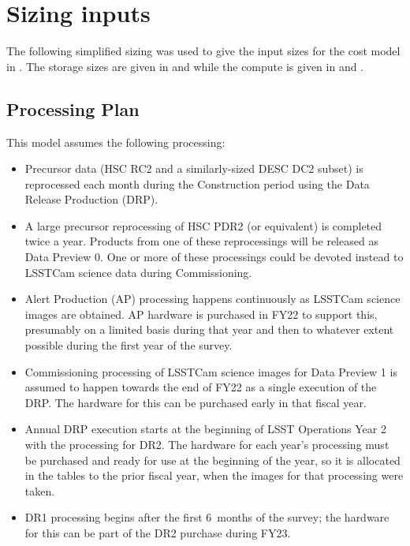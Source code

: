 \section{Sizing inputs} \label{sec:sizeinputs}

The following simplified sizing was used to give the input sizes for the cost model in .
The storage sizes are given in  and  while the compute is given in  and .

\subsection{Processing Plan}

This model assumes the following processing:
\begin{itemize}
\item Precursor data (HSC RC2 and a similarly-sized DESC DC2 subset) is reprocessed each month during the Construction period using the Data Release Production (DRP).
\item A large precursor reprocessing of HSC PDR2 (or equivalent) is completed twice a year.
Products from one of these reprocessings will be released as Data Preview 0.
One or more of these processings could be devoted instead to LSSTCam science data during Commissioning.
\item Alert Production (AP) processing happens continuously as LSSTCam science images are obtained.
AP hardware is purchased in FY22 to support this, presumably on a limited basis during that year and then to whatever extent possible during the first year of the survey.
\item Commissioning processing of LSSTCam science images for Data Preview 1 is assumed to happen towards the end of FY22 as a single execution of the DRP.
The hardware for this can be purchased early in that fiscal year.
\item Annual DRP execution starts at the beginning of LSST Operations Year 2 with the processing for DR2.
The hardware for each year's processing must be purchased and ready for use at the beginning of the year, so it is allocated in the tables to the prior fiscal year, when the images for that processing were taken.
\item DR1 processing begins after the first 6~months of the survey; the hardware for this can be part of the DR2 purchase during FY23.
\end{itemize}


